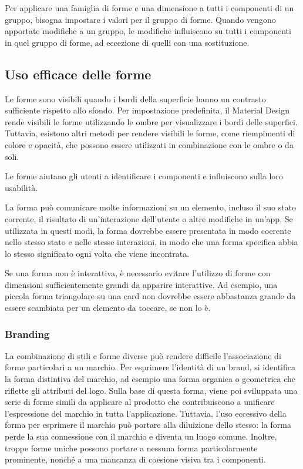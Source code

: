 \documentclass[12pt, a4paper]{report}
\begin{document}
	Per applicare una famiglia di forme e una dimensione a tutti i componenti di un gruppo, bisogna impostare i valori per il gruppo di forme. Quando vengono apportate modifiche a un gruppo, le modifiche influiscono su tutti i componenti in quel gruppo di forme, ad eccezione di quelli con una sostituzione.

	\subsection{Uso efficace delle forme}
	Le forme sono visibili quando i bordi della superficie hanno un contrasto sufficiente rispetto allo sfondo. Per impostazione predefinita, il Material Design rende visibili le forme utilizzando le ombre per visualizzare i bordi delle superfici.
	Tuttavia, esistono altri metodi per rendere visibili le forme, come riempimenti di colore e opacità, che possono essere utilizzati in combinazione con le ombre o da soli.

	Le forme aiutano gli utenti a identificare i componenti e influiscono sulla loro usabilità.

	La forma può comunicare molte informazioni su un elemento, incluso il suo stato corrente, il risultato di un'interazione dell'utente o altre modifiche in un'app. Se utilizzata in questi modi, la forma dovrebbe essere presentata in modo coerente
	nello stesso stato e nelle stesse interazioni, in modo che una forma specifica abbia lo stesso significato ogni volta che viene incontrata.

	Se una forma non è interattiva, è necessario evitare l'utilizzo di forme con dimensioni sufficientemente grandi da apparire interattive. Ad esempio, una piccola forma triangolare su una card non dovrebbe essere abbastanza grande da essere scambiata per un elemento da toccare, se non lo è.

	\subsubsection{Branding}
	La combinazione di stili e forme diverse può rendere difficile l'associazione di forme particolari a un marchio. Per esprimere l'identità di un brand, si identifica la forma distintiva del marchio, ad esempio una forma organica o geometrica che riflette
	gli attributi del logo. Sulla base di questa forma,  viene poi sviluppata una serie di forme simili da applicare al prodotto che contribuiscono a unificare l'espressione del marchio in tutta l'applicazione. Tuttavia, l'uso eccessivo della forma per esprimere il marchio può portare
	alla diluizione dello stesso: la forma perde la sua connessione con il marchio e diventa un luogo comune. Inoltre, troppe forme uniche possono portare a nessuna forma particolarmente prominente, nonché a una mancanza di coesione visiva tra i componenti.
\end{document}
